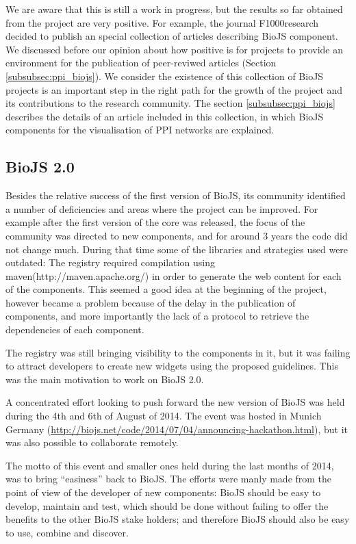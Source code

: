 We are aware that this is still a work in progress, but the results so far obtained from the project are very positive. For example, the journal F1000research decided to publish an special collection of articles describing BioJS component. We discussed before our opinion about how positive is for projects to provide an environment for the publication of peer-reviwed articles (Section \ref{subsubsec:ppi_biojs}). We consider the existence of this collection of BioJS projects is an important step in the right path for the growth of the project and its contributions to the research community. The section \ref{subsubsec:ppi_biojs} describes the details of an article included in this collection, in which BioJS components for the visualisation of PPI networks are explained.

\subsection{BioJS 2.0}
Besides the relative success of the first version of BioJS, its community identified a number of deficiencies and areas where the project can be improved. For example after the first version of the core was released, the focus of the community was directed to new components, and for around 3 years the code did not change much. During that time some of the libraries and strategies used were outdated: The registry required compilation using maven(http://maven.apache.org/) in order to generate the web content for each of the components. This seemed a good idea at the beginning of the project, however became a problem because of the delay in the publication of components, and more importantly the lack of a protocol to retrieve the dependencies of each component.

The registry was still bringing visibility to the components in it, but it was failing to attract developers to create new widgets using the proposed guidelines. This was the main motivation to work on BioJS 2.0.

A concentrated effort looking to push forward the new version of BioJS was held during the 4th and 6th of August of 2014. The event was hosted in Munich Germany (\url{http://biojs.net/code/2014/07/04/announcing-hackathon.html}), but it was also possible to collaborate remotely. 

The motto of this event and smaller ones held during the last months of 2014, was to bring ``easiness'' back to BioJS. The efforts were manly made from the point of view of the developer of new components: BioJS should be easy to develop, maintain and test, which should be done without failing to offer the benefits to the other BioJS stake holders; and therefore BioJS should also be easy to use, combine and discover.


